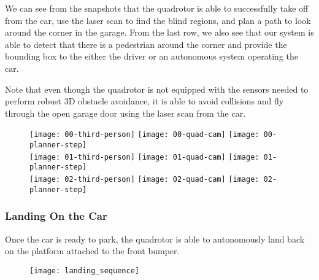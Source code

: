 We can see from the snapshots that the quadrotor is able to successfully take
off from the car, use the laser scan to find the blind regions, and plan a path
to look around the corner in the garage. From the last row, we also see that
our system is able to detect that there is a pedestrian around the corner and
provide the bounding box to the either the driver or an autonomous system
operating the car.

Note that even though the quadrotor is not equipped with the sensors needed to
perform robust 3D obstacle avoidance, it is able to avoid collisions and fly
through the open garage door using the laser scan from the car.

\begin{figure}[h!]

    \centering

    \texttt{[image: 00-third-person]}
    \texttt{[image: 00-quad-cam]}
    \texttt{[image: 00-planner-step]} \\
    \vspace*{1mm}
    \texttt{[image: 01-third-person]}
    \texttt{[image: 01-quad-cam]}
    \texttt{[image: 01-planner-step]} \\
    \vspace*{1mm}
    \texttt{[image: 02-third-person]}
    \texttt{[image: 02-quad-cam]}
    \texttt{[image: 02-planner-step]}

    \caption{}

    \label{fig:experiment}

\end{figure}

\subsubsection{Landing On the Car}

Once the car is ready to park, the quadrotor is able to autonomously land back
on the platform attached to the front bumper.

\begin{figure}[h!]

    \centering

    \centerline{\texttt{[image: landing\_sequence]}}

    \caption{}

    \label{fig:experiment}

\end{figure}
